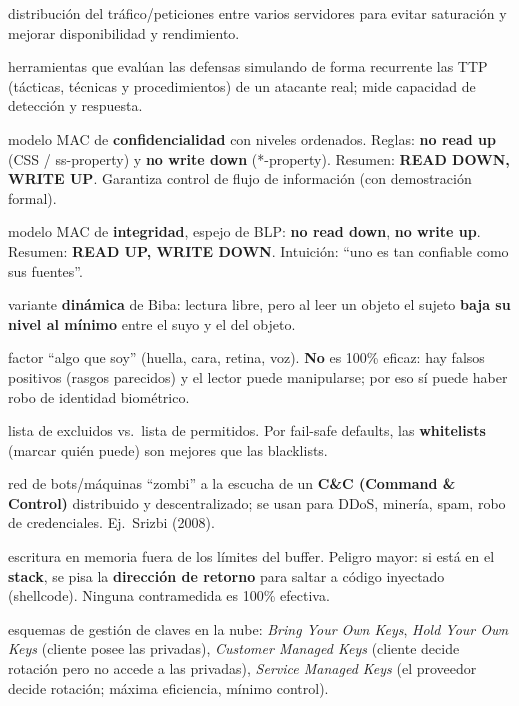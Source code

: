 \documentclass[../main.tex]{subfiles}
\begin{document}
\begin{description}[leftmargin=0pt, style=unboxed, itemsep=1pt, parsep=0pt]
  \item[\textbf{Balanceo de carga †}] distribución del tráfico/peticiones entre varios servidores para evitar saturación y mejorar disponibilidad y rendimiento.
  \item[\textbf{BAS (Breach and Attack Simulation)}] herramientas que evalúan las defensas simulando de forma recurrente las TTP (tácticas, técnicas y procedimientos) de un atacante real; mide capacidad de detección y respuesta.
  \item[\textbf{Bell-LaPadula (BLP)}] modelo MAC de \textbf{confidencialidad} con niveles ordenados. Reglas: \textbf{no read up} (CSS / ss-property) y \textbf{no write down} (*-property). Resumen: \textbf{READ DOWN, WRITE UP}. Garantiza control de flujo de información (con demostración formal).
  \item[\textbf{Biba}] modelo MAC de \textbf{integridad}, espejo de BLP: \textbf{no read down}, \textbf{no write up}. Resumen: \textbf{READ UP, WRITE DOWN}. Intuición: ``uno es tan confiable como sus fuentes''.
  \item[\textbf{Biba Low-Watermark}] variante \textbf{dinámica} de Biba: lectura libre, pero al leer un objeto el sujeto \textbf{baja su nivel al mínimo} entre el suyo y el del objeto.
  \item[\textbf{Biometría}] factor ``algo que soy'' (huella, cara, retina, voz). \textbf{No} es 100\% eficaz: hay falsos positivos (rasgos parecidos) y el lector puede manipularse; por eso sí puede haber robo de identidad biométrico.
  \item[\textbf{Blacklist / Whitelist}] lista de excluidos vs.\ lista de permitidos. Por fail-safe defaults, las \textbf{whitelists} (marcar quién puede) son mejores que las blacklists.
  \item[\textbf{Botnet}] red de bots/máquinas ``zombi'' a la escucha de un \textbf{C\&C (Command \& Control)} distribuido y descentralizado; se usan para DDoS, minería, spam, robo de credenciales. Ej.\ Srizbi (2008).
  \item[\textbf{Buffer overflow (CWE-787, Out-of-bounds Write)}] escritura en memoria fuera de los límites del buffer. Peligro mayor: si está en el \textbf{stack}, se pisa la \textbf{dirección de retorno} para saltar a código inyectado (shellcode). Ninguna contramedida es 100\% efectiva.
  \item[\textbf{BYOK / HYOK / CMK / SMK}] esquemas de gestión de claves en la nube: \emph{Bring Your Own Keys}, \emph{Hold Your Own Keys} (cliente posee las privadas), \emph{Customer Managed Keys} (cliente decide rotación pero no accede a las privadas), \emph{Service Managed Keys} (el proveedor decide rotación; máxima eficiencia, mínimo control).
\end{description}
\end{document}
